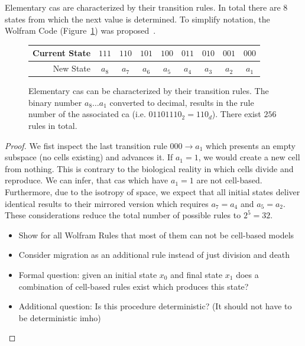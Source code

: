 \begin{theorem}
    Elementary \acp{ca} are characterized by their transition rules.
    In total there are $8$ states from which the next value is determined.
    To simplify notation, the Wolfram Code (Figure~\ref{fig:wolfram-code}) was
    proposed~\cite{Wolfram1994-yw}.
    \begin{figure}[h]
        \centering
        \begin{tabular}{ r c c c c c c c c }
            Current State & $111$ & $110$ & $101$ & $100$ & $011$ & $010$ & $001$ & $000$\\
            \midrule
            New State & $a_8$ & $a_7$ & $a_6$ & $a_5$ & $a_4$ & $a_3$ & $a_2$ & $a_1$\\
        \end{tabular}
        \caption{
            Elementary \acp{ca} can be characterized by their transition rules.
            The binary number $a_8\dots a_1$ converted to decimal, results in the rule number of
            the associated \ac{ca} (i.e. $01101110_2=110_d$).
            There exist $256$ rules in total.
        }
        \label{fig:wolfram-code}
    \end{figure}
\end{theorem}
\begin{proof}
    We fist inspect the last transition rule $000\rightarrow a_1$ which presents an empty subspace
    (no cells existing) and advances it.
    If $a_1=1$, we would create a new cell from nothing.
    This is contrary to the biological reality in which cells divide and reproduce.
    We can infer, that \acp{ca} which have $a_1=1$ are not cell-based.
    Furthermore, due to the isotropy of space, we expect that all initial states deliver identical
    results to their mirrored version which requires $a_7=a_4$ and $a_5=a_2$.
    These considerations reduce the total number of possible rules to $2^5=32$.

    \begin{itemize}
        \item Show for all Wolfram Rules that most of them can not be cell-based models
        \item Consider migration as an additional rule instead of just division and death
        \item Formal question: given an initial state $x_0$ and final state $x_1$ does a combination
            of cell-based rules exist which produces this state?
        \item Additional question: Is this procedure deterministic? (It should not have to be
            deterministic imho)
    \end{itemize}
\end{proof}

